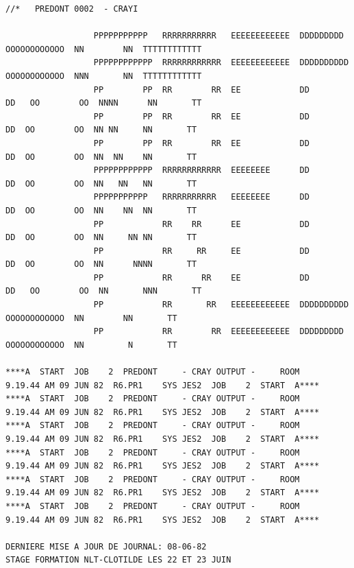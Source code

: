 {\fontsize{5}{6}\selectfont
\begin{verbatim}
//*   PREDONT 0002  - CRAYI

                  PPPPPPPPPPP   RRRRRRRRRRR   EEEEEEEEEEEE  DDDDDDDDD     OOOOOOOOOOOO  NN        NN  TTTTTTTTTTTT
                  PPPPPPPPPPPP  RRRRRRRRRRRR  EEEEEEEEEEEE  DDDDDDDDDD    OOOOOOOOOOOO  NNN       NN  TTTTTTTTTTTT
                  PP        PP  RR        RR  EE            DD       DD   OO        OO  NNNN      NN       TT
                  PP        PP  RR        RR  EE            DD        DD  OO        OO  NN NN     NN       TT
                  PP        PP  RR        RR  EE            DD        DD  OO        OO  NN  NN    NN       TT
                  PPPPPPPPPPPP  RRRRRRRRRRRR  EEEEEEEE      DD        DD  OO        OO  NN   NN   NN       TT
                  PPPPPPPPPPP   RRRRRRRRRRR   EEEEEEEE      DD        DD  OO        OO  NN    NN  NN       TT
                  PP            RR    RR      EE            DD        DD  OO        OO  NN     NN NN       TT
                  PP            RR     RR     EE            DD        DD  OO        OO  NN      NNNN       TT
                  PP            RR      RR    EE            DD       DD   OO        OO  NN       NNN       TT
                  PP            RR       RR   EEEEEEEEEEEE  DDDDDDDDDD    OOOOOOOOOOOO  NN        NN       TT
                  PP            RR        RR  EEEEEEEEEEEE  DDDDDDDDD     OOOOOOOOOOOO  NN         N       TT

****A  START  JOB    2  PREDONT     - CRAY OUTPUT -     ROOM        9.19.44 AM 09 JUN 82  R6.PR1    SYS JES2  JOB    2  START  A****
****A  START  JOB    2  PREDONT     - CRAY OUTPUT -     ROOM        9.19.44 AM 09 JUN 82  R6.PR1    SYS JES2  JOB    2  START  A****
****A  START  JOB    2  PREDONT     - CRAY OUTPUT -     ROOM        9.19.44 AM 09 JUN 82  R6.PR1    SYS JES2  JOB    2  START  A****
****A  START  JOB    2  PREDONT     - CRAY OUTPUT -     ROOM        9.19.44 AM 09 JUN 82  R6.PR1    SYS JES2  JOB    2  START  A****
****A  START  JOB    2  PREDONT     - CRAY OUTPUT -     ROOM        9.19.44 AM 09 JUN 82  R6.PR1    SYS JES2  JOB    2  START  A****
****A  START  JOB    2  PREDONT     - CRAY OUTPUT -     ROOM        9.19.44 AM 09 JUN 82  R6.PR1    SYS JES2  JOB    2  START  A****

DERNIERE MISE A JOUR DE JOURNAL: 08-06-82
STAGE FORMATION NLT-CLOTILDE LES 22 ET 23 JUIN
\end{verbatim}
}

